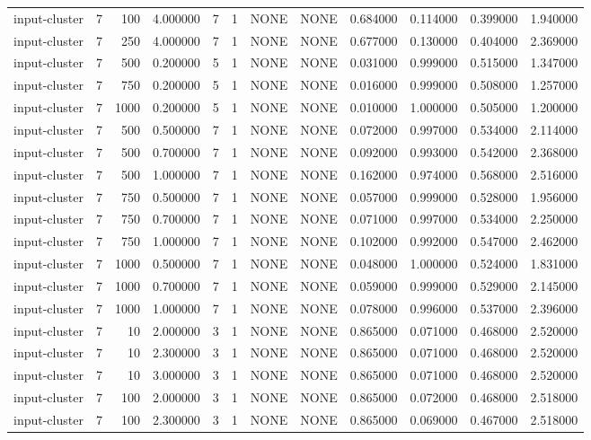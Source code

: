 \begin{tabular}{lrrrllllrrrr}
input-cluster & 7 & 100 & 4.000000 & 7 & 1 & NONE & NONE & 0.684000 & 0.114000 & 0.399000 & 1.940000 \\
input-cluster & 7 & 250 & 4.000000 & 7 & 1 & NONE & NONE & 0.677000 & 0.130000 & 0.404000 & 2.369000 \\
input-cluster & 7 & 500 & 0.200000 & 5 & 1 & NONE & NONE & 0.031000 & 0.999000 & 0.515000 & 1.347000 \\
input-cluster & 7 & 750 & 0.200000 & 5 & 1 & NONE & NONE & 0.016000 & 0.999000 & 0.508000 & 1.257000 \\
input-cluster & 7 & 1000 & 0.200000 & 5 & 1 & NONE & NONE & 0.010000 & 1.000000 & 0.505000 & 1.200000 \\
input-cluster & 7 & 500 & 0.500000 & 7 & 1 & NONE & NONE & 0.072000 & 0.997000 & 0.534000 & 2.114000 \\
input-cluster & 7 & 500 & 0.700000 & 7 & 1 & NONE & NONE & 0.092000 & 0.993000 & 0.542000 & 2.368000 \\
input-cluster & 7 & 500 & 1.000000 & 7 & 1 & NONE & NONE & 0.162000 & 0.974000 & 0.568000 & 2.516000 \\
input-cluster & 7 & 750 & 0.500000 & 7 & 1 & NONE & NONE & 0.057000 & 0.999000 & 0.528000 & 1.956000 \\
input-cluster & 7 & 750 & 0.700000 & 7 & 1 & NONE & NONE & 0.071000 & 0.997000 & 0.534000 & 2.250000 \\
input-cluster & 7 & 750 & 1.000000 & 7 & 1 & NONE & NONE & 0.102000 & 0.992000 & 0.547000 & 2.462000 \\
input-cluster & 7 & 1000 & 0.500000 & 7 & 1 & NONE & NONE & 0.048000 & 1.000000 & 0.524000 & 1.831000 \\
input-cluster & 7 & 1000 & 0.700000 & 7 & 1 & NONE & NONE & 0.059000 & 0.999000 & 0.529000 & 2.145000 \\
input-cluster & 7 & 1000 & 1.000000 & 7 & 1 & NONE & NONE & 0.078000 & 0.996000 & 0.537000 & 2.396000 \\
input-cluster & 7 & 10 & 2.000000 & 3 & 1 & NONE & NONE & 0.865000 & 0.071000 & 0.468000 & 2.520000 \\
input-cluster & 7 & 10 & 2.300000 & 3 & 1 & NONE & NONE & 0.865000 & 0.071000 & 0.468000 & 2.520000 \\
input-cluster & 7 & 10 & 3.000000 & 3 & 1 & NONE & NONE & 0.865000 & 0.071000 & 0.468000 & 2.520000 \\
input-cluster & 7 & 100 & 2.000000 & 3 & 1 & NONE & NONE & 0.865000 & 0.072000 & 0.468000 & 2.518000 \\
input-cluster & 7 & 100 & 2.300000 & 3 & 1 & NONE & NONE & 0.865000 & 0.069000 & 0.467000 & 2.518000 \\

\end{tabular}
